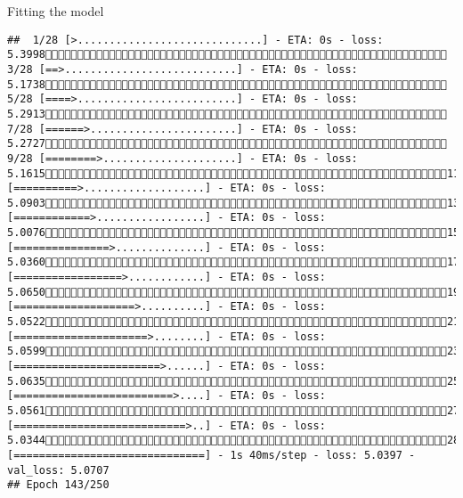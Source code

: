 \documentclass[
  ignorenonframetext,
]{beamer}
\begin{document}
\begin{frame}[fragile]{Fitting the model}
\begin{verbatim}
##  1/28 [>.............................] - ETA: 0s - loss: 5.3998 3/28 [==>...........................] - ETA: 0s - loss: 5.1738 5/28 [====>.........................] - ETA: 0s - loss: 5.2913 7/28 [======>.......................] - ETA: 0s - loss: 5.2727 9/28 [========>.....................] - ETA: 0s - loss: 5.161511/28 [==========>...................] - ETA: 0s - loss: 5.090313/28 [============>.................] - ETA: 0s - loss: 5.007615/28 [===============>..............] - ETA: 0s - loss: 5.036017/28 [=================>............] - ETA: 0s - loss: 5.065019/28 [===================>..........] - ETA: 0s - loss: 5.052221/28 [=====================>........] - ETA: 0s - loss: 5.059923/28 [=======================>......] - ETA: 0s - loss: 5.063525/28 [=========================>....] - ETA: 0s - loss: 5.056127/28 [===========================>..] - ETA: 0s - loss: 5.034428/28 [==============================] - 1s 40ms/step - loss: 5.0397 - val_loss: 5.0707
## Epoch 143/250

\end{verbatim}
\end{frame}
\end{document}

